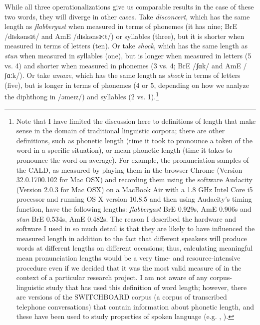 While all three operationalizations give us comparable results in the case of these two words, they will diverge in other cases. Take \textit{disconcert}, which has the same length as \textit{flabbergast} when measured in terms of phonemes (it has nine; BrE /dɪskənsɜt/ and AmE /dɪskənsɝːt/) or syllables (three), but it is shorter when measured in terms of letters (ten). Or take \textit{shock}, which has the same length as \textit{stun} when measured in syllables (one), but is longer when measured in letters (5 vs. 4) and shorter when measured in phonemes (3 vs. 4; BrE /ʃɑk/ and AmE /ʃɑːk/). Or take \textit{amaze}, which has the same length as \textit{shock} in terms of letters (five), but is longer in terms of phonemes (4 or 5, depending on how we analyze the diphthong in /əmeɪz/) and syllables (2 vs. 1).\footnote{Note that I have limited the discussion here to definitions of length that make sense in the domain of traditional linguistic corpora; there are other definitions, such as phonetic length (time it took to pronounce a token of the word in a specific situation), or mean phonetic length (time it takes to pronounce the word on average). For example, the pronunciation samples of the CALD, as measured by playing them in the browser Chrome (Version 32.0.1700.102 for Mac OSX) and recording them using the software Audacity (Version 2.0.3 for Mac OSX) on a MacBook Air with a 1.8 GHz Intel Core i5 processor and running OS X version 10.8.5 and then using Audacity's timing function, have the following lengths: \textit{flabbergast} BrE 0.929s, AmE 0.906s and \textit{stun} BrE 0.534s, AmE 0.482s. The reason I described the hardware and software I used in so much detail is that they are likely to have influenced the measured length in addition to the fact that different speakers will produce words at different lengths on different occasions; thus, calculating meaningful mean pronunciation lengths would be a very time- and resource-intensive procedure even if we decided that it was the most valid measure of  in the context of a particular research project. I am not aware of any corpus-linguistic study that has used this definition of word length; however, there are versions of the SWITCHBOARD corpus (a corpus of transcribed telephone conversations) that contain information about phonetic length, and these have been used to study properties of spoken language (e.g. \citealt{greenberg_insights_1996}, \citealt{greenberg_temporal_2003}).}

